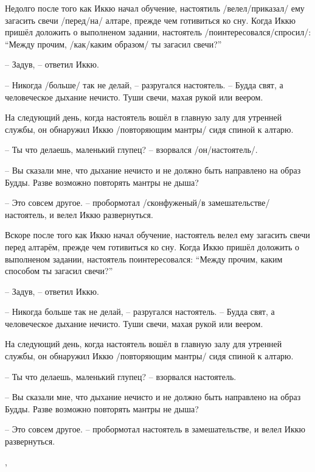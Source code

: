 \begin{ver}
Недолго после того как Иккю начал обучение, настоятиль
/велел/приказал/ ему загасить свечи /перед/на/ алтаре, прежде чем
готивиться ко сну. Когда Иккю пришёл доложить о
выполненом задании, настоятель /поинтересовался/спросил/: ``Между
прочим, /как/каким образом/ ты загасил свечи?'' 

-- Задув, -- ответил Иккю.

-- Никогда /больше/ так не делай, -- разругался настоятель. -- Будда
свят, а человеческое дыхание нечисто. Туши свечи, махая рукой или
веером.

На следующий день, когда настоятель вошёл в главную залу для утренней
службы, он обнаружил Иккю /повторяющим мантры/ сидя
спиной к алтарю.

-- Ты что делаешь, маленький глупец? -- взорвался /он/настоятель/.

-- Вы сказали мне, что дыхание нечисто и не должно быть направлено на
образ Будды. Разве возможно повторять мантры не дыша?

-- Это совсем другое. -- пробормотал /сконфуженый/в замешательстве/
настоятель, и велел Иккю развернуться.
\end{ver} 
\begin{ver}[1]
Вскоре после того как Иккю начал обучение, настоятель
велел ему загасить свечи перед алтарём, прежде чем
готивиться ко сну. Когда Иккю пришёл доложить о
выполненом задании, настоятель поинтересовался: ``Между
прочим, каким способом ты загасил свечи?'' 

-- Задув, -- ответил Иккю.

-- Никогда больше так не делай, -- разругался настоятель. -- Будда
   свят, а человеческое дыхание нечисто. Туши свечи, махая рукой или
   веером.

На следующий день, когда настоятель вошёл в главную залу для утренней
службы, он обнаружил Иккю /повторяющим мантры/ сидя
спиной к алтарю.

-- Ты что делаешь, маленький глупец? -- взорвался настоятель.

-- Вы сказали мне, что дыхание нечисто и не должно быть направлено на
   образ Будды. Разве возможно повторять мантры не дыша?

-- Это совсем другое. -- пробормотал настоятель в замешательстве, и
   велел Иккю развернуться.
\end{ver}
\sep

